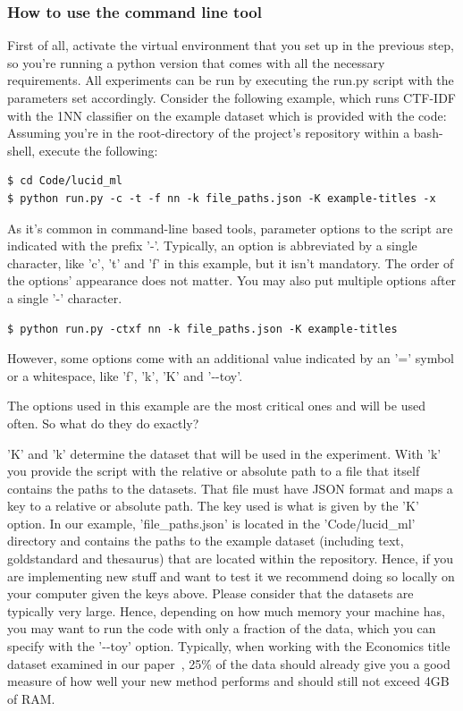\documentclass{article}
\begin{document}
\subsubsection{How to use the command line tool}
First of all, activate the virtual environment that you set up in the previous step, so you're running a python version that comes with all the necessary requirements.
All experiments can be run by executing the run.py script with the parameters set accordingly. Consider the following example, which runs CTF-IDF
with the 1NN classifier on the example dataset which is provided with the code: Assuming you're in the root-directory of the project's repository within a bash-shell,
execute the following:
\begin{lstlisting}[basicstyle=\ttfamily]
$ cd Code/lucid_ml
$ python run.py -c -t -f nn -k file_paths.json -K example-titles -x
\end{lstlisting}
As it's common in command-line based tools, parameter options to the script are indicated with the prefix '-'. Typically, an option is
abbreviated by a single character, like 'c', 't' and 'f' in this example, but it isn't mandatory. The order of the options' appearance does not matter.
You may also put multiple options after a single '-' character.
\begin{lstlisting}[basicstyle=\ttfamily]
$ python run.py -ctxf nn -k file_paths.json -K example-titles
\end{lstlisting}
However, some options come with an additional value indicated by an '=' symbol or a whitespace, like 'f', 'k', 'K' and '{-}{-}toy'.

The options used in this example are the most critical ones and will be used often. So what do they do exactly?

'K' and 'k' determine
the dataset that will be used in the experiment. With 'k' you provide the script with the relative or absolute path to a file that itself contains the paths
to the datasets. That file must have JSON format and maps a key to a relative or absolute path. The key used is what is given by the 'K' option. In our example,
'file\_paths.json' is located in the 'Code/lucid\_ml' directory and contains the paths to the example dataset (including text, goldstandard and thesaurus) that
are located within the repository. Hence,
if you are implementing new stuff and want to test it we recommend doing so locally on your computer given the keys above. Please consider that the
datasets are typically very large. Hence, depending on how much memory your machine has, you may want to run the code with only a fraction of the data,
which you can specify with the '{-}{-}toy' option. Typically, when working with the Economics title dataset examined in our paper~\cite{quadflor},
25\% of the data should already give you a good measure of how well your new method performs and should still not exceed 4GB of RAM.
\end{document}
